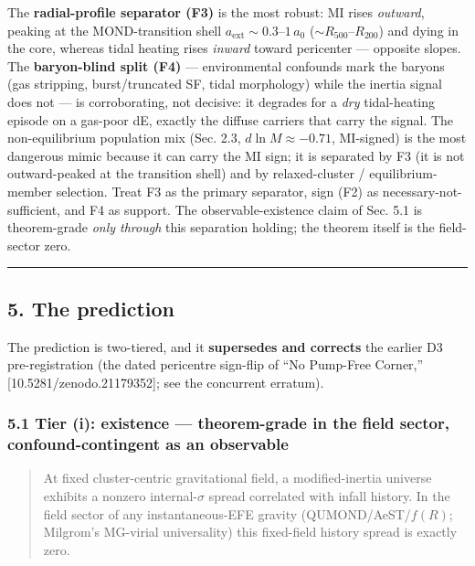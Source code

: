 \documentclass[
]{article}
\begin{document}
The \textbf{radial-profile separator (F3)} is the most robust: MI rises
\emph{outward}, peaking at the MOND-transition shell
\(a_\mathrm{ext}\sim0.3\)--\(1\,a_0\) (\(\sim R_{500}\)--\(R_{200}\)) and
dying in the core, whereas tidal heating rises \emph{inward} toward
pericenter --- opposite slopes. The \textbf{baryon-blind split (F4)} ---
environmental confounds mark the baryons (gas stripping, burst/truncated
SF, tidal morphology) while the inertia signal does not --- is
corroborating, not decisive: it degrades for a \emph{dry} tidal-heating
episode on a gas-poor dE, exactly the diffuse carriers that carry the
signal. The non-equilibrium population mix (Sec. 2.3,
\(d\ln M\approx-0.71\), MI-signed) is the most dangerous mimic because
it can carry the MI sign; it is separated by F3 (it is not
outward-peaked at the transition shell) and by relaxed-cluster /
equilibrium-member selection. Treat F3 as the primary separator, sign
(F2) as necessary-not-sufficient, and F4 as support. The
observable-existence claim of Sec. 5.1 is theorem-grade \emph{only
through} this separation holding; the theorem itself is the field-sector
zero.

\begin{center}\rule{0.5\linewidth}{0.5pt}\end{center}

\subsection{5. The prediction}\label{the-prediction}

The prediction is two-tiered, and it \textbf{supersedes and corrects}
the earlier D3 pre-registration (the dated pericentre sign-flip of ``No
Pump-Free Corner,'' {[}10.5281/zenodo.21179352{]}; see the concurrent
erratum).

\subsubsection{5.1 Tier (i): existence --- theorem-grade in the field
sector, confound-contingent as an
observable}\label{tier-i-existence-theorem-grade-in-the-field-sector-confound-contingent-as-an-observable}

\begin{quote}
At fixed cluster-centric gravitational field, a modified-inertia
universe exhibits a nonzero internal-\(\sigma\) spread correlated with
infall history. In the field sector of any instantaneous-EFE gravity
(QUMOND/AeST/\(f(R)\); Milgrom's MG-virial universality) this
fixed-field history spread is exactly zero.
\end{quote}
\end{document}
